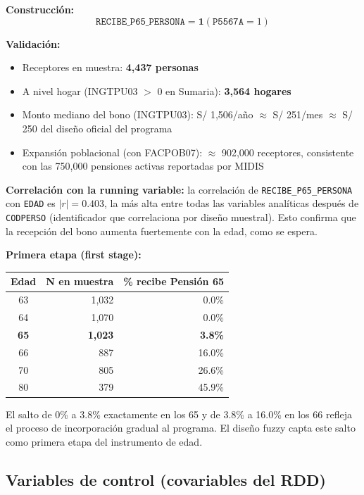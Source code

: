 \documentclass[12pt, a4paper]{article}
\begin{document}
\textbf{Construcción:}
$$\texttt{RECIBE\_P65\_PERSONA} = \mathbf{1}(\texttt{P5567A} = 1)$$

\textbf{Validación:}
\begin{itemize}[noitemsep]
  \item Receptores en muestra: \textbf{4{,}437 personas}
  \item A nivel hogar (INGTPU03 $>$ 0 en Sumaria): \textbf{3{,}564 hogares}
  \item Monto mediano del bono (INGTPU03): S/ 1{,}506/año $\approx$ S/ 251/mes
    $\approx$ S/ 250 del diseño oficial del programa \checkmark
  \item Expansión poblacional (con FACPOB07): $\approx$ 902{,}000 receptores,
    consistente con las 750{,}000 pensiones activas reportadas por MIDIS
\end{itemize}

\textbf{Correlación con la running variable:} la correlación de
\texttt{RECIBE\_P65\_PERSONA} con \texttt{EDAD} es $|r| = 0.403$, la más
alta entre todas las variables analíticas después de \texttt{CODPERSO}
(identificador que correlaciona por diseño muestral). Esto confirma que la
recepción del bono aumenta fuertemente con la edad, como se espera.

\textbf{Primera etapa (first stage):}

\begin{center}
\begin{tabular}{crr}
\toprule
Edad & N en muestra & \% recibe Pensión 65 \\\midrule
63 & 1{,}032 & 0.0\% \\
64 & 1{,}070 & 0.0\% \\
\midrule
\textbf{65} & \textbf{1{,}023} & \textbf{3.8\%} \\
66 & 887 & 16.0\% \\
70 & 805 & 26.6\% \\
80 & 379 & 45.9\% \\
\bottomrule
\end{tabular}
\end{center}

El salto de 0\% a 3.8\% exactamente en los 65 y de 3.8\% a 16.0\% en los
66 refleja el proceso de incorporación gradual al programa. El diseño fuzzy
capta este salto como primera etapa del instrumento de edad.

\subsection{Variables de control (covariables del RDD)}
\end{document}
